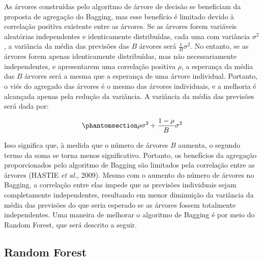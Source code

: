 \documentclass[
  12pt,
  a4paper,
]{scrreprt}
\begin{document}
\vspace{12pt}

As árvores construídas pelo algoritmo de árvore de decisão se beneficiam
da proposta de agregação do Bagging, mas esse benefício é limitado
devido à correlação positiva existente entre as árvores. Se as árvores
forem variáveis aleatórias independentes e identicamente distribuídas,
cada uma com variância \(\sigma^2\), a variância da média das previsões
das \(B\) árvores será \(\frac{1}{B} \sigma^2\). No entanto, se as
árvores forem apenas identicamente distribuídas, mas não necessariamente
independentes, e apresentarem uma correlação positiva \(\rho\), a
esperança da média das \(B\) árvores será a mesma que a esperança de uma
árvore individual. Portanto, o viés do agregado das árvores é o mesmo
das árvores individuais, e a melhoria é alcançada apenas pela redução da
variância. A variância da média das previsões será dada por:

\begin{equation}\phantomsection\label{eq-cor}{
\rho \sigma^2 + \frac{1 - \rho}{B}\sigma^2
}\end{equation}

Isso significa que, à medida que o número de árvores \(B\) aumenta, o
segundo termo da soma se torna menos significativo. Portanto, os
benefícios da agregação proporcionados pelo algoritmo de Bagging são
limitados pela correlação entre as árvores (HASTIE \emph{et al.}, 2009).
Mesmo com o aumento do número de árvores no Bagging, a correlação entre
elas impede que as previsões individuais sejam completamente
independentes, resultando em menor diminuição da variância da média das
previsões do que seria esperado se as árvores fossem totalmente
independentes. Uma maneira de melhorar o algoritmo de Bagging é por meio
do Random Forest, que será descrito a seguir.

\subsection{Random Forest}\label{random-forest}
\end{document}
